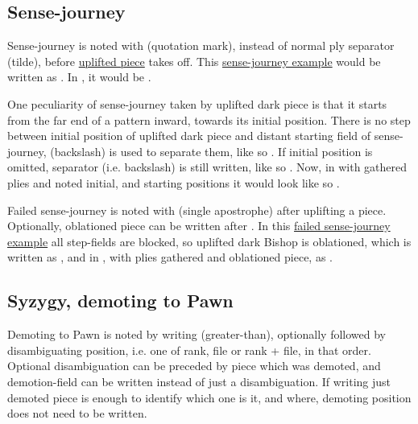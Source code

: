\subsection*{Sense-journey}
\label{sec:Appendix/Notation/Sense-journey}

Sense-journey is noted with  (quotation mark), instead of normal ply separator
\alg{\~{}} (tilde), before \hyperref[fig:scn_o_42_uplifting_step]{uplifted piece} takes
off. This \hyperref[fig:scn_o_45_dark_piece_sense_journey]{sense-journey example} would
be written as . In , it would be
.

One peculiarity of sense-journey taken by uplifted dark piece is that it starts from
the far end of a pattern inward, towards its initial position. There is no step between
initial position of uplifted dark piece and distant starting field of sense-journey,
\alg{\textbackslash} (backslash) is used to separate them, like so
.
If initial position is omitted, separator (i.e. backslash) is still written, like so
. Now, in  with gathered plies
and noted initial, and starting positions it would look like so\newline
{}\newline
\alg{[Bc5\textbackslash{}z11-n7]}.

Failed sense-journey is noted with  (single apostrophe) after uplifting a
piece. Optionally, oblationed piece can be written after . In this
\hyperref[fig:scn_o_46_sense_journey_failed]{failed sense-journey example} all
step-fields are blocked, so uplifted dark Bishop is oblationed, which is written as
, and in , with plies gathered and oblationed piece,
as .

\vfill

\subsection*{Syzygy, demoting to Pawn}
\label{sec:Appendix/Notation/Syzygy, demoting to Pawn}

Demoting to Pawn is noted by writing \alg{>} (greater-than), optionally followed by
disambiguating position, i.e. one of rank, file or rank + file, in that order. Optional
disambiguation can be preceded by piece which was demoted, and demotion-field can be
written instead of just a disambiguation. If writing just demoted piece is enough to
identify which one is it, and where, demoting position does not need to be written.

